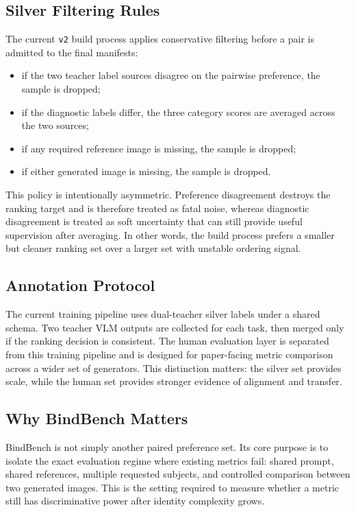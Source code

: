 \subsection{Silver Filtering Rules}
The current \texttt{v2} build process applies conservative filtering before a pair is admitted to the final manifests:
\begin{itemize}
    \item if the two teacher label sources disagree on the pairwise preference, the sample is dropped;
    \item if the diagnostic labels differ, the three category scores are averaged across the two sources;
    \item if any required reference image is missing, the sample is dropped;
    \item if either generated image is missing, the sample is dropped.
\end{itemize}
This policy is intentionally asymmetric. Preference disagreement destroys the ranking target and is therefore treated as fatal noise, whereas diagnostic disagreement is treated as soft uncertainty that can still provide useful supervision after averaging. In other words, the build process prefers a smaller but cleaner ranking set over a larger set with unstable ordering signal.

\subsection{Annotation Protocol}
The current training pipeline uses dual-teacher silver labels under a shared schema. Two teacher VLM outputs are collected for each task, then merged only if the ranking decision is consistent. The human evaluation layer is separated from this training pipeline and is designed for paper-facing metric comparison across a wider set of generators. This distinction matters: the silver set provides scale, while the human set provides stronger evidence of alignment and transfer.

\subsection{Why BindBench Matters}
BindBench is not simply another paired preference set. Its core purpose is to isolate the exact evaluation regime where existing metrics fail: shared prompt, shared references, multiple requested subjects, and controlled comparison between two generated images. This is the setting required to measure whether a metric still has discriminative power after identity complexity grows.
